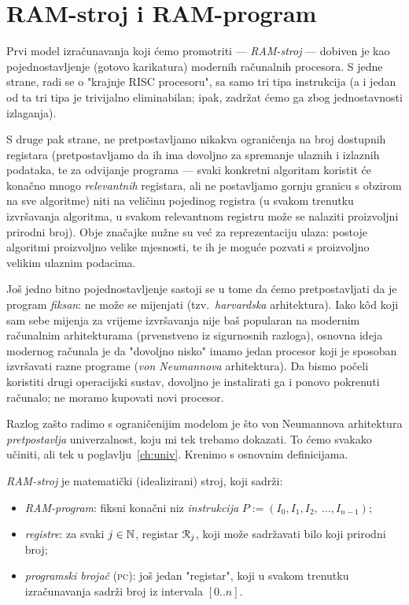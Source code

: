 \section{RAM-stroj i RAM-program}\label{sec:RAMizr}

Prvi model izračunavanja koji ćemo promotriti --- \emph{RAM-stroj} --- dobiven je kao pojednostavljenje (gotovo karikatura) modernih računalnih procesora. S jedne strane, radi se o "krajnje RISC procesoru", sa samo tri tipa instrukcija (a i jedan od ta tri tipa je trivijalno eliminabilan; ipak, zadržat ćemo ga zbog jednostavnosti izlaganja).

S druge pak strane, ne pretpostavljamo nikakva ograničenja na broj dostupnih registara (pretpostavljamo da ih ima dovoljno za spremanje ulaznih i izlaznih podataka, te za odvijanje programa --- svaki konkretni algoritam koristit će konačno mnogo \emph{relevantnih} registara, ali ne postavljamo gornju granicu s obzirom na sve algoritme) niti na veličinu pojedinog registra (u svakom trenutku izvršavanja algoritma, u svakom relevantnom registru može se nalaziti proizvoljni prirodni broj). Obje značajke nužne su već za reprezentaciju ulaza: postoje algoritmi proizvoljno velike mjesnosti, te ih je moguće pozvati s proizvoljno velikim ulaznim podacima.

Još jedno bitno pojednostavljenje sastoji se u tome da ćemo pretpostavljati da je program \emph{fiksan}: ne može se mijenjati (tzv.\ \emph{harvardska} arhitektura). Iako k\^od koji sam sebe mijenja za vrijeme izvršavanja nije baš popularan na modernim računalnim arhitekturama (prvenstveno iz sigurnosnih razloga), osnovna ideja modernog računala je da "dovoljno nisko" imamo jedan procesor koji je sposoban izvršavati razne programe (\emph{von Neumannova} arhitektura). Da bismo počeli koristiti drugi operacijski sustav, dovoljno je instalirati ga i ponovo pokrenuti računalo; ne moramo kupovati novi procesor.

Razlog zašto radimo s ograničenijim modelom je što von Neumannova arhitektura \emph{pretpostavlja} univerzalnost, koju mi tek trebamo dokazati. To ćemo svakako učiniti, ali tek u poglavlju~\ref{ch:univ}. Krenimo s osnovnim definicijama.


\begin{definicija}[{name=[RAM-stroj]}]
\emph{RAM-stroj} je matematički (idealizirani) stroj, koji sadrži:
\begin{itemize}
    \item \emph{RAM-program}: fiksni konačni niz \emph{instrukcija} $P:=(I_0,I_1,I_2,~\dotsc, I_{n-1})$;
    \item \emph{registre}: za svaki $j\in{\mathbb N}$, registar $\mathcal R_{j}$, koji može sadržavati bilo koji prirodni broj;
    \item \emph{programski brojač} (\textsc{pc}): još jedan "registar", koji u svakom trenutku iz\-ra\-ču\-na\-va\-nja sadrži broj iz intervala $[0..n]$.
    \qedhere
\end{itemize}
\end{definicija}

